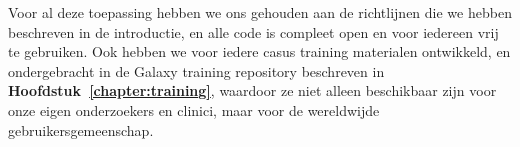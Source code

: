 Voor al deze toepassing hebben we ons gehouden aan de richtlijnen die we hebben beschreven in de introductie, en alle code is compleet open en voor iedereen vrij te gebruiken. Ook hebben we voor iedere casus training materialen ontwikkeld, en ondergebracht in de Galaxy training repository beschreven in \textbf{Hoofdstuk~\ref{chapter:training}}, waardoor ze niet alleen beschikbaar zijn voor onze eigen onderzoekers en clinici, maar voor de wereldwijde gebruikersgemeenschap.


